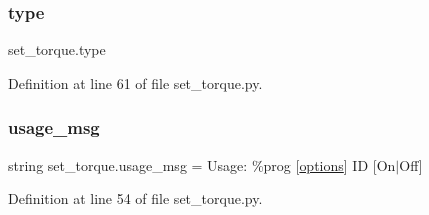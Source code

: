 \mbox{\label{namespaceset__torque_a4088ec83409d3c6941ccab6445575c21}} 
\subsubsection{\texorpdfstring{type}{type}}
{\footnotesize\ttfamily set\+\_\+torque.\+type}



Definition at line 61 of file set\+\_\+torque.\+py.

\mbox{\label{namespaceset__torque_ac57a865b31cdc6e55fd5593f50488de6}} 
\subsubsection{\texorpdfstring{usage\+\_\+msg}{usage\_msg}}
{\footnotesize\ttfamily string set\+\_\+torque.\+usage\+\_\+msg = \textquotesingle{}Usage\+: \%prog \mbox{[}\hyperlink{namespaceset__torque_a0b961e29ab6d708b77dab37ac082ee90}{options}\mbox{]} ID \mbox{[}On$\vert$Off\mbox{]}\textquotesingle{}}



Definition at line 54 of file set\+\_\+torque.\+py.

